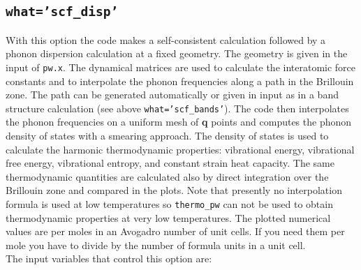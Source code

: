\documentclass[12pt,a4paper]{article}
\begin{document}
\subsection{\color{web-blue}\texttt{what='scf\_disp'}}
With this option the code makes a self-consistent calculation followed by
a phonon dispersion calculation at a fixed geometry. The geometry is given in the 
input of \texttt{pw.x}. The dynamical matrices are used to calculate 
the interatomic force constants and to interpolate the phonon frequencies 
along a path in the Brillouin zone. The path can be generated automatically 
or given in input as in a band structure calculation (see above \texttt{what='scf\_bands'}). The code then 
interpolates the phonon frequencies on a uniform mesh of {\bf q} points and 
computes the phonon density of states with a smearing approach. The density of 
states is used to calculate the harmonic thermodynamic properties: 
vibrational energy, vibrational free energy, vibrational entropy, and 
constant strain heat capacity.
The same thermodynamic quantities are calculated also by direct 
integration over the Brillouin zone and compared in the plots.
Note that presently no interpolation formula is used at low temperatures
so \texttt{thermo\_pw} can not be used to obtain thermodynamic 
properties at very low temperatures. 
The plotted numerical values are per moles in an Avogadro number of unit 
cells. If you need them per mole you have to divide by the number 
of formula units in a unit cell. \\
The input variables that control this option are:
\end{document}
